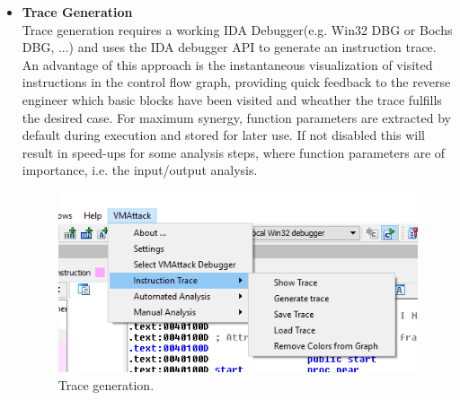 \documentclass[10pt,twoside,a4paper,bibliography=totoc]{scrbook}
\begin{document}
\begin{itemize}
\item{\textbf{Trace Generation}}\\
\newline
Trace generation requires a working IDA Debugger(e.g. Win32 DBG or Bochs DBG, ...) and uses the IDA debugger API to generate an instruction trace. An advantage of this approach is the instantaneous visualization of visited instructions in the control flow graph, providing quick feedback to the reverse engineer which basic blocks have been visited and wheather the trace fulfills the desired case.
For maximum synergy, function parameters are extracted by default during execution and stored for later use. If not disabled this will result in speed-ups for some analysis steps, where function parameters are of importance, i.e. the input/output analysis.
\begin{figure}[htp]
\centering
\includegraphics[scale=0.75]{images/ch3/generate_trace.png}
\caption{Trace generation.}
\label{gen_trace}
\end{figure}


\end{itemize}
\end{document}
